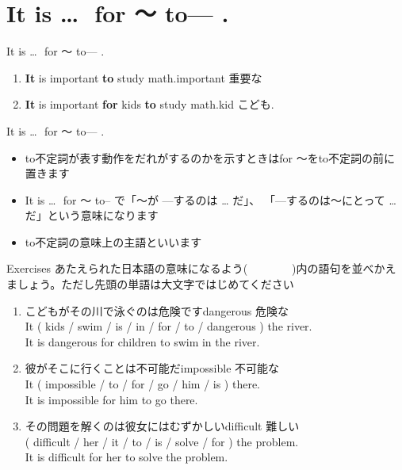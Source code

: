\documentclass[aspectratio=169,xcolor={dvipsnames,table}]{beamer}
\begin{document}
\section{It is \ldots\,\, for ～ to--- .}
\begin{frame}[plain]{It is \ldots\,\, for ～ to--- .}
 \large

\begin{enumerate}
 \item {\bfseries It} is important {\bfseries to} study math.\hfill{\scriptsize important  重要な}
 \item {\bfseries It} is important {\bfseries for} kids {\bfseries to} study math.\hfill{\scriptsize kid  こども}.
\end{enumerate}

\begin{block}{It is \ldots\,\, for ～ to--- .}\small
\begin{itemize}[square]
 \item to不定詞が表す動作をだれがするのかを示すときはfor ～をto不定詞の前に置きます
 \item It is\,\,\ldots\,\, for ～ to--\,\,で「～が ---するのは \ldots\,\,だ」、
「---するのは～にとって \ldots\,\,だ」という意味になります
 \item to不定詞の意味上の主語といいます

\end{itemize}
\end{block}
\mbox{}\hfill{\scriptsize {}}
\end{frame}
\begin{frame}[plain]{Exercises}
 あたえられた日本語の意味になるよう(~~~~~~~~)内の語句を並べかえましょう。ただし先頭の単語は大文字ではじめてください%
\mbox{}\hfill{\scriptsize {}}

\begin{enumerate}
 \item こどもがその川で泳ぐのは危険です\hfill{\scriptsize dangerous  危険な}\\
It ( kids / swim / is / in / for / to / dangerous ) the river.\\
It is dangerous for children to swim in the river.
 \item 彼がそこに行くことは不可能だ\hfill{\scriptsize impossible  不可能な}\\
It ( impossible / to / for / go / him / is ) there.\\
It is impossible for him to go there.
 \item その問題を解くのは彼女にはむずかしい\hfill{\scriptsize difficult  難しい}\\
( difficult / her / it / to / is / solve / for ) the problem.\\
It is difficult for her to solve the problem.

\end{enumerate}
\end{frame}
\end{document}
